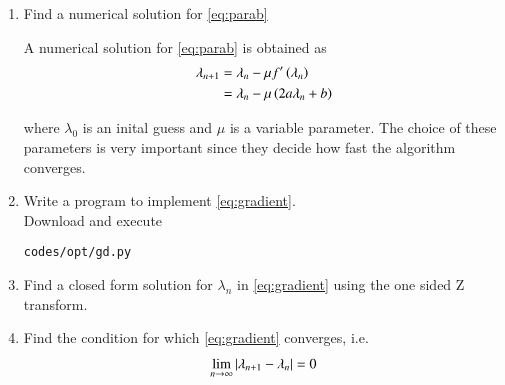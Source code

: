 \renewcommand{\theequation}{\theenumi}
\begin{enumerate}[label=\arabic*.,ref=\thesection.\theenumi]
%
%

\item
Find a numerical solution for \eqref{eq:parab}

%
%
\solution
A numerical solution for \eqref{eq:parab} is obtained as
%
\begin{align}
\lambda_{n+1}&=\lambda_{n}-\mu f^{\prime}\left(\lambda_n\right)
\\
&=\lambda_{n} -\mu \left(2a\lambda_n+b\right)
\label{eq:gradient}
\end{align}

%
where $\lambda_0$ is an inital guess and $\mu$ is a variable parameter. The choice of these parameters is very important since they decide how fast the algorithm converges.
%
\item
Write a program to implement \eqref{eq:gradient}.
%
\\
\solution Download and execute
\begin{lstlisting}
codes/opt/gd.py
\end{lstlisting}
%
\item Find a closed form solution for $\lambda_n$ in  \eqref{eq:gradient} using the one sided Z transform.
%
\item Find the condition for which \eqref{eq:gradient} converges, i.e.
\begin{align}
\lim_{n \to \infty}\left\vert\lambda_{n+1}-\lambda_n\right\vert = 0
\end{align}
\end{enumerate}

